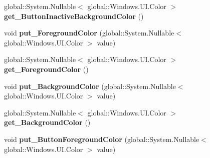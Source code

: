 \begin{DoxyCompactItemize}
\item 
\mbox{\label{interface_windows_1_1_u_i_1_1_view_management_1_1_i_application_view_title_bar_a6c110cc1abc214ae3ab4e3fad20dbd79}} 
global\+::\+System.\+Nullable$<$ global\+::\+Windows.\+U\+I.\+Color $>$ {\bfseries get\+\_\+\+Button\+Inactive\+Background\+Color} ()
\item 
\mbox{\label{interface_windows_1_1_u_i_1_1_view_management_1_1_i_application_view_title_bar_a2c9b8e377e58bb9b24d1831d431d7cb8}} 
void {\bfseries put\+\_\+\+Foreground\+Color} (global\+::\+System.\+Nullable$<$ global\+::\+Windows.\+U\+I.\+Color $>$ value)
\item 
\mbox{\label{interface_windows_1_1_u_i_1_1_view_management_1_1_i_application_view_title_bar_a5fe06168420ee342f2b206c5db71e9d4}} 
global\+::\+System.\+Nullable$<$ global\+::\+Windows.\+U\+I.\+Color $>$ {\bfseries get\+\_\+\+Foreground\+Color} ()
\item 
\mbox{\label{interface_windows_1_1_u_i_1_1_view_management_1_1_i_application_view_title_bar_a8f1570efd073d4f98de8305ea238203d}} 
void {\bfseries put\+\_\+\+Background\+Color} (global\+::\+System.\+Nullable$<$ global\+::\+Windows.\+U\+I.\+Color $>$ value)
\item 
\mbox{\label{interface_windows_1_1_u_i_1_1_view_management_1_1_i_application_view_title_bar_af30b2ae748ffe820b7b1c6f69ef893b1}} 
global\+::\+System.\+Nullable$<$ global\+::\+Windows.\+U\+I.\+Color $>$ {\bfseries get\+\_\+\+Background\+Color} ()
\item 
\mbox{\label{interface_windows_1_1_u_i_1_1_view_management_1_1_i_application_view_title_bar_a79b0e9d27826cb5e56af8d4a73f6cd2f}} 
void {\bfseries put\+\_\+\+Button\+Foreground\+Color} (global\+::\+System.\+Nullable$<$ global\+::\+Windows.\+U\+I.\+Color $>$ value)
\item 

\end{DoxyCompactItemize}
